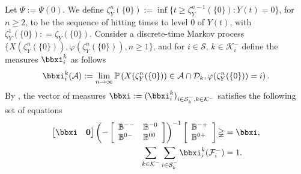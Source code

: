 Let $\mathbb\Psi := \mathbb\Psi(0)$. We define $\zeta_Y^n(\{0\}) := \inf\{t \geq \zeta_Y^{n - 1}(\{0\}): Y(t) = 0\}$, for $n \geq  2$, to be the sequence of hitting times to level $0$ of $Y(t)$, with $\zeta_Y^1(\{0\}): = \zeta_Y(\{0\})$. Consider a discrete-time Markov process $\{X({\zeta_Y^n(\{0\})}), \varphi(\zeta_Y^n(\{0\})),n \geq 1\}$, and for $i \in \mathcal{S},\,k\in\mathcal K_i^-$ define the measures $\bbxi_i^k$ as follows 
	\begin{align*}
		\bbxi_i^k(\mathcal{A}) := \lim_{n \rightarrow \infty} \mathbb{P}\left(X(\zeta_Y^n(\{0\})) \in \mathcal{A}\cap\calD_k, \varphi(\zeta_Y^n(\{0\})) = i\right).
	\end{align*} 
	By \citep{bo2014}, the vector of measures $\boldsymbol{\bbxi} := (\bbxi_i^k)_{i \in \mathcal{S}_k^-,k\in\mathcal K^-}$ satisfies the following set of equations 
 	\begin{align}
		\vligne{\boldsymbol{\bbxi}  & \boldsymbol{0}}\left(-\left[\begin{array}{ll} 
			\mathbb{B}^{--} & \mathbb{B}^{-0} \\
			\mathbb{B}^{0-} & \mathbb{B}^{00} 
		\end{array} \right]\right)^{-1}\left[\begin{array}{l} 
			\mathbb{B}^{-+} \\ 
			\mathbb{B}^{0+}
		\end{array} \right]\mathbb\Psi & = \boldsymbol{\bbxi}, \label{eqn:xi1}\\ 
		\sum_{k\in\mathcal K^-}\sum_{i \in \mathcal{S}_k^-}\bbxi_i^k(\mathcal{F}^-_i) & = 1. \label{eqn:xi2}
	\end{align} 

